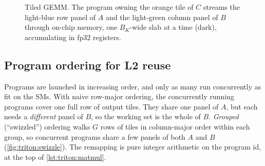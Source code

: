 \begin{figure}[t]
\centering
{}
\caption{Tiled GEMM. The program owning the orange tile of $C$ streams the light-blue
row panel of $A$ and the light-green column panel of $B$ through on-chip memory, one
$B_K$-wide slab at a time (dark), accumulating in fp32 registers.}
\label{fig:triton:tiling}
\end{figure}

\subsection{Program ordering for L2 reuse}
Programs are launched in increasing  order, and only as many run concurrently
as fit on the SMs. With naive row-major ordering, the concurrently running programs
cover one full row of output tiles. They share one panel of $A$, but each needs a
\emph{different} panel of $B$, so the working set is the whole of $B$. \emph{Grouped}
(``swizzled'') ordering walks $G$ rows of tiles in column-major order within each
group, so concurrent programs share a few panels of both $A$ and $B$
(\cref{fig:triton:swizzle}). The remapping is pure integer arithmetic on the program id,
at the top of \cref{lst:triton:matmul}.

